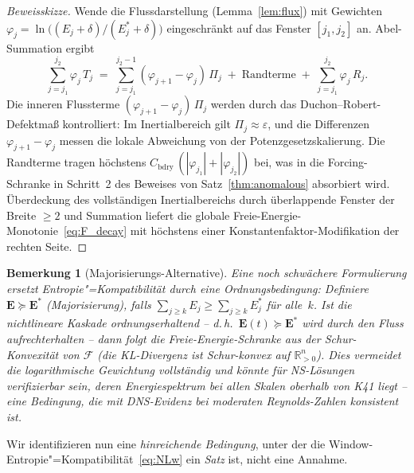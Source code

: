 \documentclass[12pt,a4paper]{article}
\theoremstyle{breakdef}
\theoremstyle{breakplain}
\theoremstyle{breakdef}
\newtheorem{remark}[definition]{Bemerkung}
\begin{document}
\begin{proof}[Beweisskizze]
Wende die Flussdarstellung (Lemma~\ref{lem:flux}) mit Gewichten
$\varphi_j = \ln\bigl((E_j+\delta)/(E_j^*+\delta)\bigr)$
eingeschränkt auf das Fenster $[j_1, j_2]$ an. Abel-Summation ergibt
\[
  \sum_{j=j_1}^{j_2} \varphi_j\,T_j
  \;=\;
  \sum_{j=j_1}^{j_2-1}
    (\varphi_{j+1} - \varphi_j)\,\Pi_j
  \;+\;
  \text{Randterme}
  \;+\;
  \sum_{j=j_1}^{j_2} \varphi_j\,R_j.
\]
Die inneren Flussterme $(\varphi_{j+1} - \varphi_j)\,\Pi_j$ werden
durch das Duchon--Robert-Defektmaß kontrolliert: Im Inertialbereich
gilt $\Pi_j \approx \varepsilon$, und die Differenzen $\varphi_{j+1}-\varphi_j$
messen die lokale Abweichung von der Potenzgesetzskalierung.
Die Randterme tragen höchstens
$C_{\mathrm{bdry}}\,(|\varphi_{j_1}|+|\varphi_{j_2}|)$ bei, was
in die Forcing-Schranke in Schritt~2 des Beweises von
Satz~\ref{thm:anomalous} absorbiert wird. Überdeckung des
vollständigen Inertialbereichs durch überlappende Fenster der Breite
$\ge 2$ und Summation liefert die globale Freie-Energie-Monotonie~\eqref{eq:F_decay}
mit höchstens einer Konstantenfaktor-Modifikation der rechten Seite.
\end{proof}

\begin{remark}[Majorisierungs-Alternative]
\label{rem:majorization}
Eine noch schwächere Formulierung ersetzt Entropie"=Kompatibilität durch eine
\emph{Ordnungsbedingung}: Definiere $\mathbf{E} \succeq \mathbf{E}^*$
(Majorisierung), falls $\sum_{j \ge k} E_j \ge \sum_{j \ge k} E_j^*$ für
alle~$k$. Ist die nichtlineare Kaskade \emph{ordnungserhaltend} -- d.\,h.\
$\mathbf{E}(t) \succeq \mathbf{E}^*$ wird durch den Fluss aufrechterhalten --
dann folgt die Freie-Energie-Schranke aus der Schur-Konvexität von
$\mathcal{F}$ (die KL-Divergenz ist Schur-konvex auf
$\mathbb{R}_{>0}^n$). Dies vermeidet die logarithmische Gewichtung
vollständig und könnte für NS-Lösungen verifizierbar sein, deren
Energiespektrum bei allen Skalen \glqq oberhalb von K41\grqq{} liegt -- eine
Bedingung, die mit DNS-Evidenz bei moderaten Reynolds-Zahlen konsistent ist.
\end{remark}

Wir identifizieren nun eine \emph{hinreichende Bedingung}, unter der die
Window-Entropie"=Kompatibilität~\eqref{eq:NLw} ein \emph{Satz} ist, nicht
eine Annahme.
\end{document}
